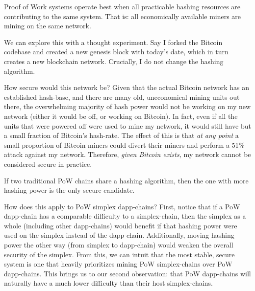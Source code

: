 

\label{sec:child-chain-pow-pos-asymmetry}


Proof of Work systems operate best when all practicable hashing resources are contributing to the same system.
That is: all economically available miners are mining on the same network.

We can explore this with a thought experiment.
Say I forked the Bitcoin codebase and created a new genesis block with today's date, which in turn creates a new blockchain network.
Crucially, I do not change the hashing algorithm.

How secure would this network be?
Given that the actual Bitcoin network has an established hash-base, and there are many old, uneconomical mining units out there, the overwhelming majority of hash power would not be working on my new network (either it would be off, or working on Bitcoin).
In fact, even if all the units that were powered off were used to mine my network, it would still have but a small fraction of Bitcoin's hash-rate.
The effect of this is that \emph{at any point} a small proportion of Bitcoin miners could divert their miners and perform a 51\% attack against my network.
Therefore, \emph{given Bitcoin exists,} my network cannot be considered secure in practice.

If two traditional PoW chains share a hashing algorithm, then the one with more hashing power is the only secure candidate.

How does this apply to PoW simplex dapp-chains?
First, notice that if a PoW dapp-chain has a comparable difficulty to a simplex-chain, then the simplex as a whole (including other dapp-chains) would benefit if that hashing power were used on the simplex instead of the dapp-chain.
Additionally, moving hashing power the other way (from simplex to dapp-chain) would weaken the overall security of the simplex.
From this, we can intuit that the most stable, secure system is one that heavily prioritizes mining PoW simplex-chains over PoW dapp-chains.
This brings us to our second observation: that PoW dapp-chains will naturally have a much lower difficulty than their host simplex-chains.

